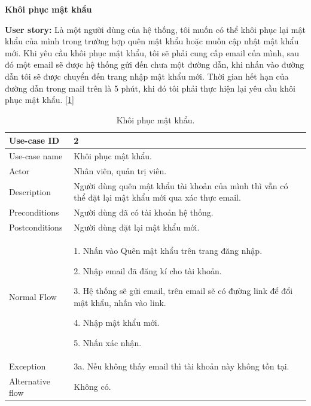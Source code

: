 \newpage
\textbf{Khôi phục mật khẩu}\par
\textbf{User story:} Là một người dùng của hệ thống, tôi muốn có thể khôi phục lại mật khẩu của mình trong trường hợp quên mật khẩu hoặc muốn cập nhật mật khẩu mới. Khi yêu cầu khôi phục mật khẩu, tôi sẽ phải cung cấp email của mình, sau đó một email sẽ được hệ thống gửi đến chưa một đường dẫn, khi nhấn vào đường dẫn tôi sẽ được chuyển đến trang nhập mật khẩu mới. Thời gian hết hạn của đường dẫn trong mail trên là 5 phút, khi đó tôi phải thực hiện lại yêu cầu khôi phục mật khẩu. [\ref{bang2}]
\begin{table}[!htp]
    \centering
    \begin{tabular}{|m{3cm}|m{10cm}|}
    \hline 
        Use-case ID & 2\\ \hline
        Use-case name & Khôi phục mật khẩu.\\ \hline
        Actor & Nhân viên, quản trị viên.\\ \hline
        Description & Người dùng quên mật khẩu tài khoản của mình thì vẫn có thể đặt lại mật khẩu mới qua xác thực email.\\ \hline
        Preconditions & Người dùng đã có tài khoản hệ thống.\\ \hline
        Postconditions & Người dùng đặt lại mật khẩu mới.\\ \hline
        Normal Flow & 
        1. Nhấn vào Quên mật khẩu trên trang đăng nhập.\par
        2. Nhập email đã đăng kí cho tài khoản.\par
        3. Hệ thống sẽ gửi email, trên email sẽ có đường link để đổi mật khẩu, nhấn vào link.\par
        4. Nhập mật khẩu mới.\par
        5. Nhấn xác nhận.
        \\ \hline
        Exception & 3a. Nếu không thấy email thì tài khoản này không tồn tại.\\ \hline
        Alternative flow & Không có.\\ 
    \hline 
    \end{tabular}
    \caption{Khôi phục mật khẩu.}
    \label{bang2}
\end{table}

